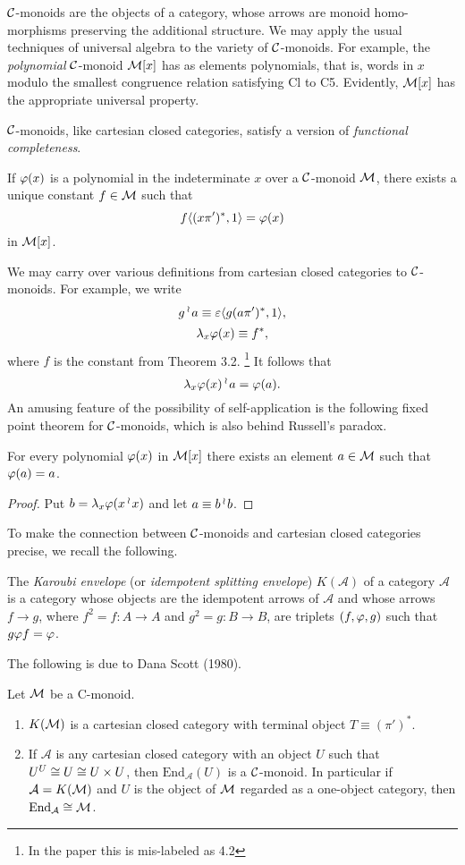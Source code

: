 $\mathcal C$-monoids are the objects of a category, whose arrows are monoid homo-
morphisms preserving the additional structure. We may apply the usual
techniques of universal algebra to the variety of $\mathcal C$-monoids. For example, the
{\em polynomial} $\mathcal C$-monoid ${\mathcal M}[x]$ has as elements polynomials, that is, words in $x$
modulo the smallest congruence relation satisfying Cl to C5. Evidently,
${\mathcal M}[x]$ has the appropriate universal property.

$\mathcal C$-monoids, like cartesian closed categories, satisfy a version of
{\em functional completeness}.

\begin{thm}
If $\varphi(x)$ is a polynomial in the indeterminate $x$ over a
$\mathcal C$-monoid ${\mathcal M}$, there exists a unique constant $f\in {\mathcal M}$ such that
\[
f\langle (x\pi')^*, 1 \rangle = \varphi(x)
\]
in ${\mathcal M}[x]$.
\end{thm}
We may carry over various definitions from cartesian closed categories
to $\mathcal C$-monoids. For example, we write
\[
g\mathop{{}^\wr}\kern-.8pt a \equiv \varepsilon \langle g(a \pi')^*,1\rangle,
\]
\[
\lambda_x \varphi(x) \equiv f^*,
\]
where $f$ is the constant from Theorem 3.2.%
\footnote{In the paper this is mis-labeled as 4.2}
It follows that
\[
\lambda_x \varphi(x) \mathop{{}^\wr}\kern-.8pt a = \varphi(a).
\]
An amusing feature of the possibility of self-application is the
following fixed point theorem for $\mathcal C$-monoids, which is also behind Russell's
paradox.

\begin{prop}
For every polynomial $\varphi(x)$ in ${\mathcal M}[x]$ there exists an
element $a \in {\mathcal M}$ such that $\varphi(a) = a$.
\end{prop}

\begin{proof}
Put $b = \lambda_x \varphi(x \mathop{{}^\wr}\kern-.8pt x)$ and let $a \equiv b \mathop{{}^\wr}\kern-.8pt b$.
\end{proof}

To make the connection between $\mathcal C$-monoids and cartesian closed categories
precise, we recall the following.

\begin{defn}
The {\em Karoubi envelope} (or {\em idempotent splitting envelope})
$K(\mathcal A)$ of a category $\mathcal A$ is a category whose objects
are the idempotent arrows of $\mathcal A$ and whose arrows $f \to g$, where
$f^2 = f: A \to A$ and $g^2 = g: B \to B$, are triplets
$(f, \varphi, g)$ such that $g\varphi f = \varphi$.
\end{defn}

The following is due to Dana Scott (1980).

\begin{thm}
Let ${\mathcal M}$ be a C-monoid.
\begin{enumerate}[label=(\roman*)]
\item $K({\mathcal M})$ is a cartesian closed category  with terminal object
$T \equiv (\pi')^*$.
\item If $\mathcal A$ is any cartesian closed category with an object $U$
such that $U^{U} \cong U \cong U \times U$, then $\text{End}_{\mathcal A}(U)$
is a $\mathcal C$-monoid. In particular if ${\mathcal A} = K({\mathcal M})$
and $U$ is the object of ${\mathcal M}$
regarded as a one-object category, then $\text{End}_{\mathcal A} \cong {\mathcal M}$.
\end{enumerate}
\end{thm}

